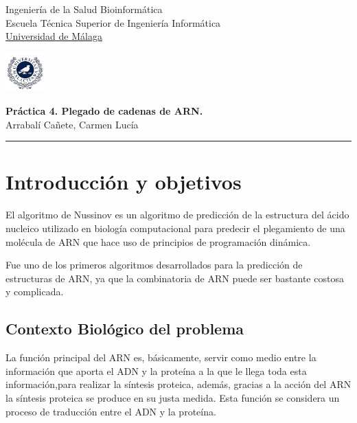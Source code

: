 \documentclass[11pt,letterpaper]{article}
\begin{document}

\usetikzlibrary{positioning}
\pagestyle{plain}
\begin{flushleft}
Ingeniería de la Salud \hfill Bioinformática\\
Escuela Técnica Superior de Ingeniería Informática\\
\underline{Universidad de Málaga}
\end{flushleft}

\begin{flushright}\vspace{-5mm}
\includegraphics[height=1.5cm]{escudo.jpg}
\end{flushright}

\begin{center}\vspace{-1cm}
\textbf{\large Práctica 4. Plegado de cadenas de ARN.}\\   %
Arrabalí Cañete, Carmen Lucía\\                         %
\end{center}
\rule{\linewidth}{0.1mm}


\section{Introducción y objetivos}
El algoritmo de Nussinov es un algoritmo de predicción de la estructura del ácido nucleico utilizado en biología computacional para predecir el plegamiento de una molécula de ARN que hace uso de principios de programación dinámica.  

Fue uno de los primeros algoritmos desarrollados para la predicción de estructuras de ARN, ya que la combinatoria de ARN puede ser bastante costosa y complicada. 

\subsection{Contexto Biológico del problema}
La función principal del ARN es, básicamente, servir como medio entre la información que aporta el ADN y la proteína a la que le llega toda esta información,para realizar la síntesis proteica, además, gracias a la acción del ARN la síntesis proteica se produce en su justa medida. Esta función se considera un proceso de traducción entre el ADN y la proteína. 
\end{document}
